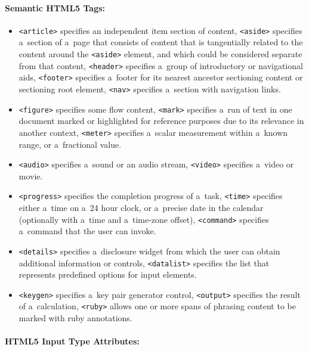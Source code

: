 \paragraph{Semantic HTML5 Tags:}

\begin{itemize}
  \item \texttt{<article>} specifies an independent item
        section of content,
        \texttt{<aside>} specifies a~section of a~page that
        consists of content that is tangentially related
        to the content around the \texttt{<aside>} element,
        and which could be considered separate from
        that content, \texttt{<header>} specifies a~group of
        introductory or navigational aids,
        \texttt{<footer>} specifies a~footer for its nearest
        ancestor sectioning content or sectioning root element,
        \texttt{<nav>} specifies a~section with navigation links.
  \item \texttt{<figure>} specifies some flow content,
        \texttt{<mark>} specifies a~run of text in one document
        marked or highlighted for reference purposes
        due to its relevance in another context,
        \texttt{<meter>} specifies a~scalar measurement within
        a~known range, or a~fractional value.
  \item \texttt{<audio>} specifies a~sound or an audio stream,
        \texttt{<video>} specifies a~video or movie.
  \item \texttt{<progress>} specifies the completion progress
        of a~task, \texttt{<time>} specifies either a~time
        on a~24 hour clock, or a~precise date in the calendar
        (optionally with a~time and a~time-zone offset),
        \texttt{<command>} specifies a~command that the user
        can invoke.
  \item \texttt{<details>} specifies a~disclosure widget
        from which the user can obtain additional information or
        controls, \texttt{<datalist>} specifies the list that
        represents predefined options for input elements.
  \item \texttt{<keygen>} specifies a~key pair generator control,
        \texttt{<output>} specifies the result of a~calculation,
        \texttt{<ruby>} allows one or more spans of phrasing
        content to be marked with ruby annotations.
\end{itemize}

\paragraph{HTML5 Input Type Attributes:}


